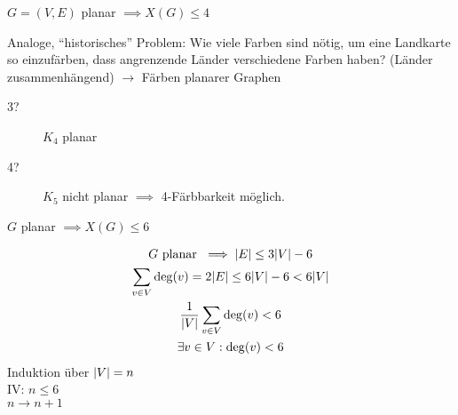 \begin{satz*}
	$G=(V,E)$ planar $\implies X(G) \leq 4$
\end{satz*}
Analoge, \enquote{historisches} Problem: Wie viele Farben sind nötig, um eine Landkarte so einzufärben, dass angrenzende Länder verschiedene Farben haben? (Länder zusammenhängend) $\rightarrow$ Färben planarer Graphen

\begin{description}
	\item[3?] $K_4$ planar
	\item[4?] $K_5$ nicht planar $\implies$ 4-Färbbarkeit möglich.
\end{description}

\begin{satz*}
	$G$ planar $\implies X(G) \leq 6$\\
	\begin{bew}
		\begin{gather*}
			G \text{ planar } \implies \abs{E} \leq 3 \abs{V} - 6 \\
			\sum_{v \in V} \deg(v) = 2 \abs{E} \leq 6\abs{V} - 6 < 6\abs{V} \\
			\frac{1}{\abs{V}} \sum_{v \in V} \deg(v) < 6 \\
			\exists v \in V : \deg(v) < 6
		\end{gather*}
		Induktion über $\abs{V} = n$ \\
		IV: $n \leq 6$ \\
		$n \rightarrow n+1$
	\end{bew}
\end{satz*}
